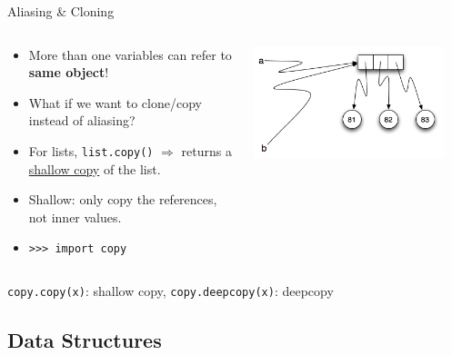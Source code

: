     \begin{frame}{Aliasing \& Cloning}
        \Large
        \begin{columns}
            \begin{column}[c]{0.6\textwidth}
                \begin{itemize}
                    \item More than one variables can refer to \textbf{same object}!
                    \item What if we want to clone/copy instead of aliasing?
                    \item For lists, \texttt{list.copy()} $\Rightarrow$ returns a \underline{shallow copy} of the list.
                    \item Shallow: only copy the references, not inner values.
                    \item \texttt{>>> import copy}
                \end{itemize}
            \end{column}
            \begin{column}[c]{0.4\textwidth}
                \includegraphics[width=0.9\textwidth]{../Lecture6/images/aliasing.png}
            \end{column}
        \end{columns}
        \texttt{copy.copy(x)}: shallow copy, \texttt{copy.deepcopy(x)}: deepcopy   
    \end{frame}

    \subsection{Data Structures}

